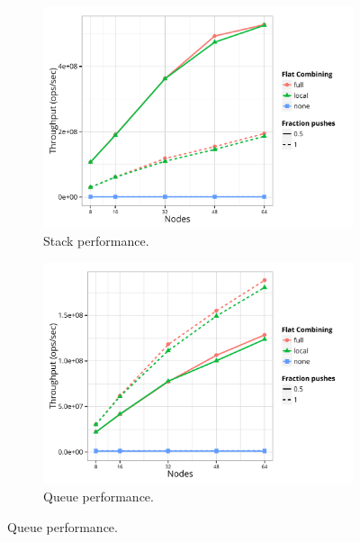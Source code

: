 \begin{figure}[t]
  \centering
  \begin{subfigure}[b]{0.45\textwidth}
  \centering
  \includegraphics[width=\textwidth]{data/plots/stack_perf.pdf}
  \caption{Stack performance.}
  \label{fig:stack}
  \end{subfigure}%
  \hspace{0.05\textwidth}
  \begin{subfigure}[b]{0.45\textwidth}
  \centering
  \includegraphics[width=\textwidth]{data/plots/queue_perf.pdf}
  \caption{Queue performance.}
  \label{fig:queue}
  \end{subfigure}
  

\end{figure}
